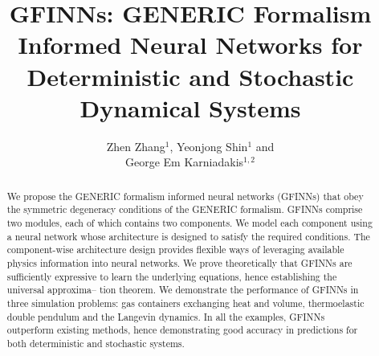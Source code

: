 \documentclass[openacc]{rsproca_new}%
\begin{document}
\title{
GFINNs: GENERIC Formalism Informed Neural Networks for Deterministic and Stochastic Dynamical Systems}



\author{%
Zhen Zhang$^{1}$, Yeonjong Shin$^{1}$ 
and \\
George Em Karniadakis$^{1,2}$}

\address{$^{1}$ Division of Applied Mathematics, 
and $^{2}$ School of Engineering,
Brown University, Providence, RI, 02912, USA\\}


\subject{deep learning, applied mathematics, thermodynamics}




\begin{abstract}
  We propose the GENERIC formalism informed neural networks (GFINNs)
  that obey the symmetric degeneracy conditions of the GENERIC
  formalism.
  GFINNs comprise two modules, each of which contains
  two components. 
  We model each component using a neural network whose architecture is designed to satisfy the required conditions.
  The component-wise architecture design 
  provides flexible ways of leveraging available physics
  information into neural networks.
  We prove theoretically that GFINNs
  are sufficiently expressive to learn the
  underlying equations, hence establishing the
  universal approxima--
  tion theorem. 
  We demonstrate the performance of GFINNs in three simulation
  problems: gas containers exchanging heat and volume,
  thermoelastic double pendulum and the Langevin 
  dynamics. In all the examples, 
  GFINNs outperform existing methods, hence demonstrating good accuracy in predictions for both deterministic and stochastic systems.
\end{abstract}
\end{document}
